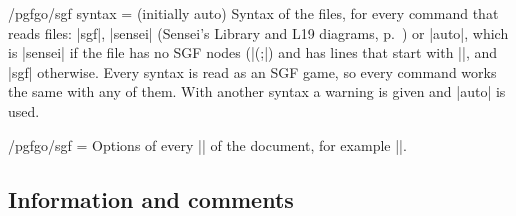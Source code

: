 \begin{key}{/pgfgo/sgf syntax =  (initially auto)}
	Syntax of the files, for every command that reads files: |sgf|, |sensei| (Sensei's Library and L19 diagrams, p.~\pageref{subsec:sgfsensei}) or |auto|, which is |sensei| if the file has no SGF nodes (|(;|) and has lines that start with |$$|, and |sgf| otherwise. Every syntax is read as an SGF game, so every command works the same with any of them. With another syntax a warning is given and |auto| is used.
\end{key}

\begin{key}{/pgfgo/sgf = }
	Options of every |\sgf| of the document, for example ||.
\end{key}

\subsection{Information and comments}
\label{subsec:sgfdatos}

